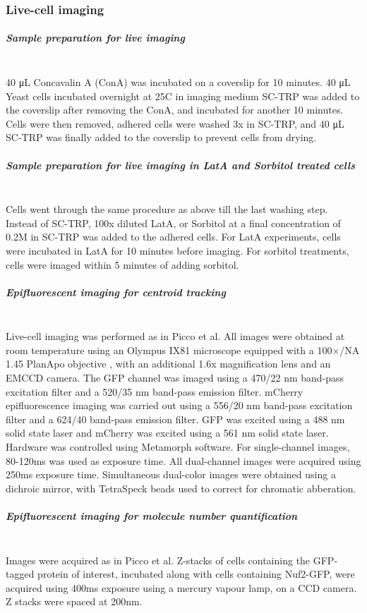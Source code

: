 \subsubsection{Live-cell imaging}
\subparagraph{Sample preparation for live imaging}
			\mbox{}\\
40 μL Concavalin A (ConA) was incubated on a coverslip for 10 minutes. 40 μL Yeast cells incubated overnight at 25C in imaging medium SC-TRP was added to the coverslip after removing the ConA, and incubated for another 10 minutes. Cells were then removed, adhered cells were washed 3x in SC-TRP, and 40 μL SC-TRP was finally added to the coverslip to prevent cells from drying. 

\subparagraph{Sample preparation for live imaging in LatA and Sorbitol treated cells}
\mbox{}\\
Cells went through the same procedure as above till the last washing step. Instead of SC-TRP, 100x diluted LatA, or Sorbitol at a final concentration of 0.2M in SC-TRP was added to the adhered cells. For LatA experiments, cells were incubated in LatA for 10 minutes before imaging. For sorbitol treatments, cells were imaged within 5 minutes of adding sorbitol.

\subparagraph{Epifluorescent imaging for centroid tracking}
			\mbox{}\\
Live-cell imaging was performed as in Picco et al. All images were obtained at room temperature using an Olympus IX81 microscope equipped with a 100×/NA 1.45 PlanApo objective , with an additional 1.6x magnification lens and an EMCCD camera. The GFP channel was imaged using a 470/22 nm band-pass excitation filter and a 520/35 nm band-pass emission filter. mCherry epifluorescence imaging was carried out using a 556/20 nm band-pass excitation filter and a 624/40 band-pass emission filter. GFP was excited using a 488 nm solid state laser and mCherry was excited using a 561 nm solid state laser. Hardware was controlled using Metamorph software. For single-channel images, 80-120ms was used as exposure time. All dual-channel images were acquired using 250ms exposure time. Simultaneous dual-color images were obtained using a dichroic mirror, with TetraSpeck beads used to correct for chromatic abberation.

\subparagraph{Epifluorescent imaging for molecule number quantification}
			\mbox{}\\
Images were acquired as in Picco et al. Z-stacks of cells containing the GFP-tagged protein of interest, incubated along with cells containing Nuf2-GFP, were acquired using 400ms exposure using a mercury vapour lamp, on a CCD camera. Z stacks were spaced at 200nm. 


